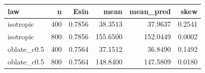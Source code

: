 \begin{tabular}{lrrrrr}
\toprule
law & n & Esin & mean & mean_pred & skew \\
\midrule
isotropic & 400 & 0.7856 & 38.3513 & 37.9637 & 0.2541 \\
isotropic & 800 & 0.7856 & 155.6500 & 152.0449 & 0.0002 \\
oblate_c0.5 & 400 & 0.7564 & 37.1512 & 36.8490 & 0.1492 \\
oblate_c0.5 & 800 & 0.7564 & 148.8400 & 147.5809 & 0.0180 \\
\bottomrule
\end{tabular}
